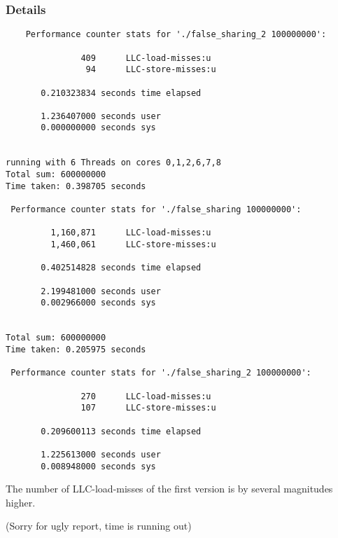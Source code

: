 \documentclass[parskip]{scrartcl}
\begin{document}
	\subsubsection{Details}
	\begin{verbatim}
	Performance counter stats for './false_sharing_2 100000000':

               409      LLC-load-misses:u                                           
                94      LLC-store-misses:u                                          

       0.210323834 seconds time elapsed

       1.236407000 seconds user
       0.000000000 seconds sys


running with 6 Threads on cores 0,1,2,6,7,8
Total sum: 600000000
Time taken: 0.398705 seconds

 Performance counter stats for './false_sharing 100000000':

         1,160,871      LLC-load-misses:u                                           
         1,460,061      LLC-store-misses:u                                          

       0.402514828 seconds time elapsed

       2.199481000 seconds user
       0.002966000 seconds sys


Total sum: 600000000
Time taken: 0.205975 seconds

 Performance counter stats for './false_sharing_2 100000000':

               270      LLC-load-misses:u                                           
               107      LLC-store-misses:u                                          

       0.209600113 seconds time elapsed

       1.225613000 seconds user
       0.008948000 seconds sys
	\end{verbatim}
	
	The number of LLC-load-misses of the first version is by several magnitudes higher.
	
	(Sorry for ugly report, time is running out)
\end{document}
